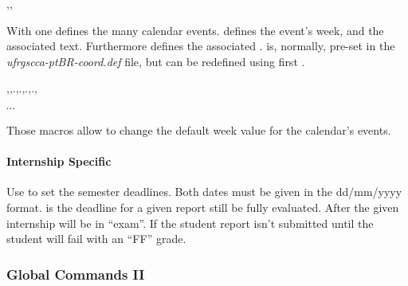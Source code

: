 \documentclass[article,nogeometry,english,tocdepth=3,secdepth=3]{ufrgscca} %
\begin{document}
\begin{codedescribe}[code,update=2023/05/29]{\tcccalendarreset,\tcccalendarevent,\tcccalendareventdate}
	\begin{codesyntax}%
    \tsmacro{\tcccalendarreset}{}
	\end{codesyntax}
With \tsobj{\tcccalendarevent} one defines the many calendar events.  defines the event's week, and   the associated text. Furthermore \tsobj{\tcccalendareventdate} defines the associated . \tsobj{\tcccalendarevent} is, normally, pre-set in the \emph{ufrgscca-ptBR-coord.def} file, but can be redefined using first \tsobj{\tcccalendarreset}.
\end{codedescribe}


\begin{codedescribe}{\tcceventAweek,\tcceventBweek,.,.,.,.,\tcceventJweek}
    \begin{codesyntax}%
        \ensuremath{\cdots}
    \end{codesyntax}
    Those macros allow to change the default week value for the calendar's events.
\end{codedescribe}

\paragraph{Internship Specific}

\begin{codedescribe}{\intershipcommitdates}
    \begin{codesyntax}%
    \end{codesyntax}
    Use \tsmacro{\intershipcommitdates}{} to set the semester deadlines. Both dates must be given in the dd/mm/yyyy format.
     is the deadline for a given report still be fully evaluated. After  the given internship will be in “exam”. If the student report isn't submitted until  the student will fail with an “FF” grade.
\end{codedescribe}



\subsubsection{Global Commands II}\label{new-student}
\end{document}
